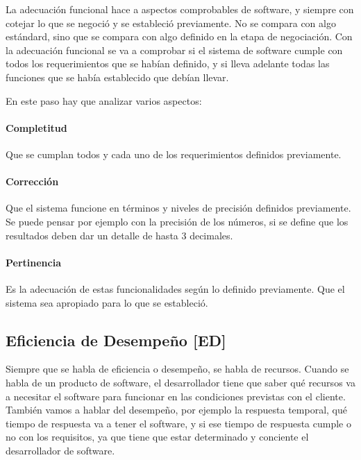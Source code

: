 La adecuación funcional hace a aspectos comprobables de software, y
siempre con cotejar lo que se negoció y se estableció previamente. No se
compara con algo estándard, sino que se compara con algo definido en la
etapa de negociación. Con la adecuación funcional se va a comprobar si
el sistema de software cumple con todos los requerimientos que se habían
definido, y si lleva adelante todas las funciones que se había
establecido que debían llevar.

En este paso hay que analizar varios aspectos:

\hypertarget{completitud}{%
\paragraph{Completitud}\label{completitud}}
  Que se cumplan todos y cada uno de los requerimientos definidos previamente.
\hypertarget{correccion}{%
\paragraph{Corrección}\label{correccion}}
 Que el sistema funcione en términos y niveles de
  precisión definidos previamente. Se puede pensar por ejemplo con la
  precisión de los números, si se define que los resultados deben dar un
  detalle de hasta 3 decimales.
\hypertarget{pertinencia}{%
\paragraph{Pertinencia}\label{pertinencia}}
  Es la adecuación de estas funcionalidades según
  lo definido previamente. Que el sistema sea apropiado para lo que se
  estableció.
\hypertarget{eficiencia-de-desempeuxf1o-ed}{%
\subsection{Eficiencia de Desempeño
{[}ED{]}}\label{eficiencia-de-desempeuxf1o-ed}}

Siempre que se habla de eficiencia o desempeño, se habla de recursos.
Cuando se habla de un producto de software, el desarrollador tiene que
saber qué recursos va a necesitar el software para funcionar en las
condiciones previstas con el cliente. También vamos a hablar del
desempeño, por ejemplo la respuesta temporal, qué tiempo de respuesta va
a tener el software, y si ese tiempo de respuesta cumple o no con los
requisitos, ya que tiene que estar determinado y conciente el
desarrollador de software.

